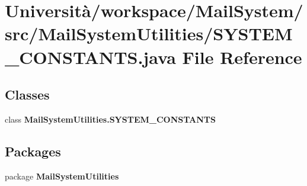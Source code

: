 \section{Università/workspace/\+Mail\+System/src/\+Mail\+System\+Utilities/\+S\+Y\+S\+T\+E\+M\+\_\+\+C\+O\+N\+S\+T\+A\+N\+TS.java File Reference}
\label{_s_y_s_t_e_m___c_o_n_s_t_a_n_t_s_8java}
\subsection*{Classes}
\begin{DoxyCompactItemize}
\item 
class \textbf{ Mail\+System\+Utilities.\+S\+Y\+S\+T\+E\+M\+\_\+\+C\+O\+N\+S\+T\+A\+N\+TS}
\end{DoxyCompactItemize}
\subsection*{Packages}
\begin{DoxyCompactItemize}
\item 
package \textbf{ Mail\+System\+Utilities}
\end{DoxyCompactItemize}
